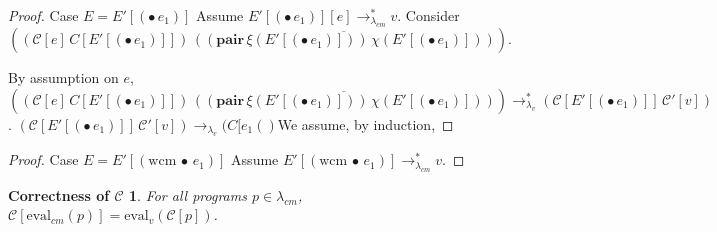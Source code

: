 \documentclass[ms,electronic,twosidetoc,letterpaper,chaptercenter,parttop]{byumsphd}
\begin{document}
\begin{proof}{Case $E=E'[(\bullet\,e_1)]$}
Assume $E'[(\bullet\,e_1)][e]\rightarrow_{\lambda_{cm}}^{*}v$. Consider $((\mathcal{C}[e]\,C[E'[(\bullet\,e_1)]])\,\overline{((\mathbf{pair}\,\xi(E'[(\bullet\,e_1)]))\,\chi(E'[(\bullet\,e_1)]))})$.

By assumption on $e$, $((\mathcal{C}[e]\,C[E'[(\bullet\,e_1)]])\,\overline{((\mathbf{pair}\,\xi(E'[(\bullet\,e_1)]))\,\chi(E'[(\bullet\,e_1)]))})\rightarrow_{\lambda_v}^{*}(\mathcal{C}[E'[(\bullet\,e_1)]]\,\mathcal{C}'[v])$. $(\mathcal{C}[E'[(\bullet\,e_1)]]\,\mathcal{C}'[v])\rightarrow_{\lambda_v}(C[e_1()$We assume, by induction, 
\end{proof}

\begin{proof}{Case $E=E'[(\mathrm{wcm}\,\bullet\,e_1)]$}
Assume $E'[(\mathrm{wcm}\,\bullet\,e_1)]\rightarrow_{\lambda_{cm}}^{*}v$.

\end{proof}

\newtheorem*{maintheorem}{Correctness of $\mathcal{C}$}
\begin{maintheorem}
For all programs $p\in\lambda_{cm}$, $\mathcal{C}[\mathrm{eval}_{cm}(p)]=\mathrm{eval}_{v}(\mathcal{C}[p])$.
\end{maintheorem}
\end{document}
